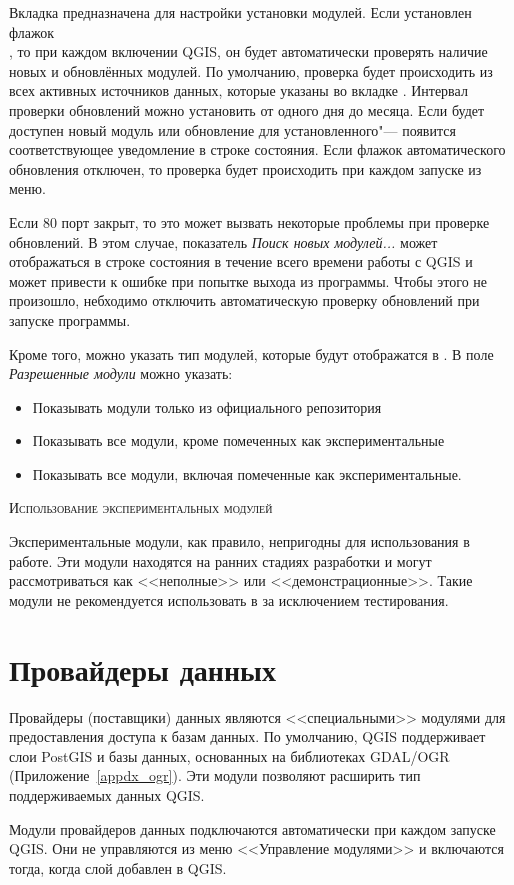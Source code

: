 
Вкладка  предназначена для настройки установки модулей.
Если установлен флажок \\
, то
при каждом включении QGIS, он будет автоматически проверять наличие
новых и обновлённых модулей. По умолчанию, проверка будет происходить
из всех активных источников данных, которые указаны во вкладке
. Интервал проверки обновлений можно установить от
одного дня до месяца. Если будет доступен новый модуль или обновление
для установленного"--- появится соответствующее уведомление в строке
состояния. Если флажок автоматического обновления отключен, то проверка
будет происходить при каждом запуске  из
меню.

Если 80 порт закрыт, то это может вызвать некоторые проблемы при
проверке обновлений. В этом случае, показатель
\textit{Поиск новых модулей...} может отображаться в строке состояния
в течение всего времени работы с QGIS и может привести к ошибке при
попытке выхода из программы. Чтобы этого не произошло, небходимо
отключить автоматическую проверку обновлений при запуске программы.

Кроме того, можно указать тип модулей, которые будут отображатся в
. В поле \textit{Разрешенные модули} можно
указать:

\begin{itemize}[label=--]
\item Показывать модули только из официального репозитория
\item Показывать все модули, кроме помеченных как экспериментальные
\item Показывать все модули, включая помеченные как экспериментальные.
\end{itemize}

\begin{Tip}
 \caption{\textsc{Использование экспериментальных модулей}}
Экспериментальные модули, как правило, непригодны для использования в
работе. Эти модули находятся на ранних стадиях разработки и могут
рассмотриваться как <<неполные>> или <<демонстрационные>>. Такие модули
не рекомендуется использовать в за исключением тестирования.
\end{Tip}

\section{Провайдеры данных}

Провайдеры (поставщики) данных являются <<специальными>> модулями для
предоставления доступа к базам данных. По умолчанию, QGIS поддерживает
слои PostGIS и базы данных, основанных на библиотеках GDAL/OGR
(Приложение~\ref{appdx_ogr}). Эти модули позволяют расширить тип
поддерживаемых данных QGIS.

Модули провайдеров данных подключаются автоматически при каждом запуске
QGIS. Они не управляются из меню <<Управление модулями>> и включаются
тогда, когда слой добавлен в QGIS.

\FloatBarrier
